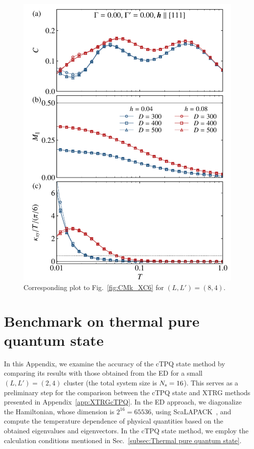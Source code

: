 \documentclass[twocolumn,superscriptaddress,showpacs, longbibliography, aps, prx]{revtex4-2}
\begin{document}
\begin{figure}[t]
  \begin{center}
    \includegraphics[width=\linewidth]{Data_for_figs/plot/fig-19-XTRG-Ddep84.pdf}
  \end{center}
  \caption{Corresponding plot to Fig.~\ref{fig:CMk_XC6} for $(L, L') = (8, 4)$.} 
  \label{fig:CMk_XC4}
\end{figure}

\section{Benchmark on thermal pure quantum state}
\label{app:cTPQ}
In this Appendix, we examine the accuracy of the cTPQ state method by comparing its results with those obtained from the ED for a small $(L, L') = (2, 4)$ cluster (the total system size is $N_{\rm s}=16$).
This serves as a preliminary step for the comparison between the cTPQ state and XTRG methods presented in Appendix~\ref{app:XTRGcTPQ}. 
In the ED approach, we diagonalize the Hamiltonian, whose dimension is
$2^{16}=65536$, using ScaLAPACK~\cite{scalapack}, and compute the temperature dependence of physical quantities based on the obtained eigenvalues and eigenvectors.
In the cTPQ state method, we employ the calculation conditions mentioned in Sec.~\ref{subsec:Thermal pure quantum state}.
\end{document}
